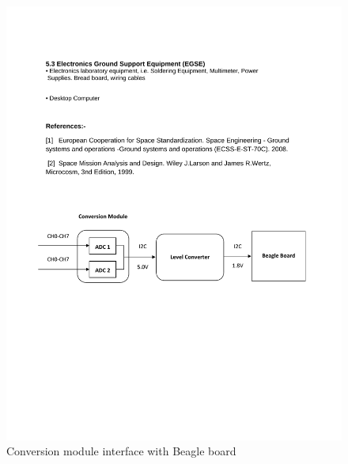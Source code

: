 \begin{figure}[bht]
\centering
\includegraphics[scale=0.7]{figures/conversion_module.pdf}
\caption{Conversion module interface with Beagle board}
\label{fig:conversion_module}
\end{figure}
